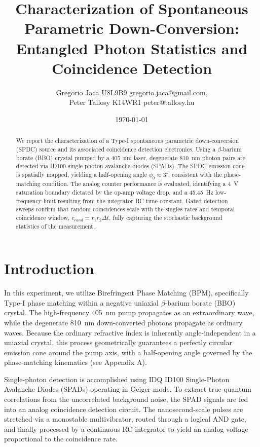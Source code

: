 \documentclass[12pt,a4paper]{article}
\title{Characterization of Spontaneous Parametric Down-Conversion:\\
Entangled Photon Statistics and Coincidence Detection}
\author{Gregorio Jaca U8L9B9 gregorio.jaca@gmail.com, \\
Peter Tallosy K14WR1 peter@tallosy.hu}
\date{\today}
\begin{document}
\maketitle

\begin{abstract}
We report the characterization of a Type-I spontaneous parametric down-conversion (SPDC) source and its associated coincidence detection electronics. Using a $\beta$-barium borate (BBO) crystal pumped by a \SI{405}{\nano\meter} laser, degenerate \SI{810}{\nano\meter} photon pairs are detected via ID100 single-photon avalanche diodes (SPADs). The SPDC emission cone is spatially mapped, yielding a half-opening angle $\phi_0 \approx 3^\circ$, consistent with the phase-matching condition. 
The analog counter performance is evaluated, identifying a \SI{4}{\volt} saturation boundary dictated by the op-amp voltage drop, and a \SI{45.45}{\hertz} low-frequency limit resulting from the integrator RC time constant. Gated detection sweeps confirm that random coincidences scale with the singles rates and temporal coincidence window, $c_{rand} = r_1 r_2 \Delta t$, fully capturing the stochastic background statistics of the measurement.
\end{abstract}

\section{Introduction}

In this experiment, we utilize Birefringent Phase Matching (BPM), specifically Type-I phase matching within a negative uniaxial $\beta$-barium borate (BBO) crystal. The high-frequency \SI{405}{\nano\meter} pump propagates as an extraordinary wave, while the degenerate \SI{810}{\nano\meter} down-converted photons propagate as ordinary waves. Because the ordinary refractive index is inherently angle-independent in a uniaxial crystal, this process geometrically guarantees a perfectly circular emission cone around the pump axis, with a half-opening angle governed by the phase-matching kinematics (see Appendix A).

Single-photon detection is accomplished using IDQ ID100 Single-Photon Avalanche Diodes (SPADs) operating in Geiger mode. To extract true quantum correlations from the uncorrelated background noise, the SPAD signals are fed into an analog coincidence detection circuit. The nanosecond-scale pulses are stretched via a monostable multivibrator, routed through a logical AND gate, and finally processed by a continuous RC integrator to yield an analog voltage proportional to the coincidence rate.
\end{document}
